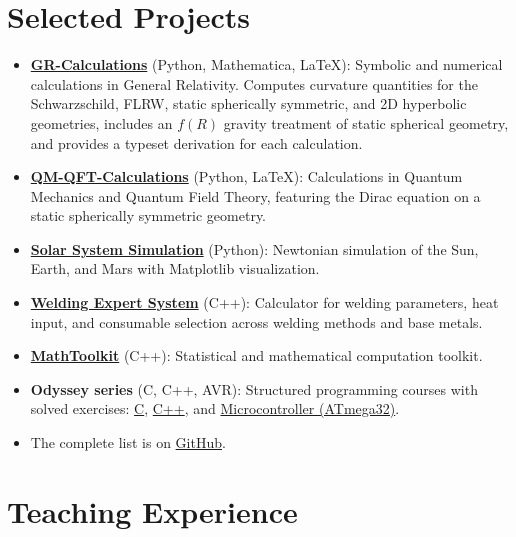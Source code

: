 \documentclass[11pt,a4paper]{article}
\begin{document}
	\section{Selected Projects}

	\begin{itemize}[label=--]
		\item \textbf{\href{https://github.com/AbolfazlMohammadi2005/GR-Calculations}{GR-Calculations}} (Python, Mathematica, LaTeX): Symbolic and numerical calculations in General Relativity. Computes curvature quantities for the Schwarzschild, FLRW, static spherically symmetric, and 2D hyperbolic geometries, includes an $f(R)$ gravity treatment of static spherical geometry, and provides a typeset derivation for each calculation.
		\item \textbf{\href{https://github.com/AbolfazlMohammadi2005/QM-QFT-Calculations}{QM-QFT-Calculations}} (Python, LaTeX): Calculations in Quantum Mechanics and Quantum Field Theory, featuring the Dirac equation on a static spherically symmetric geometry.
		\item \textbf{\href{https://github.com/AbolfazlMohammadi2005/Simple-small-scale-simulation-of-the-solar-system}{Solar System Simulation}} (Python): Newtonian simulation of the Sun, Earth, and Mars with Matplotlib visualization.
		\item \textbf{\href{https://github.com/AbolfazlMohammadi2005/Welding-Project}{Welding Expert System}} (C++): Calculator for welding parameters, heat input, and consumable selection across welding methods and base metals.
		\item \textbf{\href{https://github.com/AbolfazlMohammadi2005/MathToolkit}{MathToolkit}} (C++): Statistical and mathematical computation toolkit.
		\item \textbf{Odyssey series} (C, C++, AVR): Structured programming courses with solved exercises:
			\href{https://github.com/AbolfazlMohammadi2005/C-Odyssey}{C},
			\href{https://github.com/AbolfazlMohammadi2005/Cpp-Odyssey}{C++}, and
			\href{https://github.com/AbolfazlMohammadi2005/Microcontroller-Odyssey}{Microcontroller (ATmega32)}.
		\item The complete list is on \href{https://github.com/AbolfazlMohammadi2005?tab=repositories}{GitHub}.
	\end{itemize}

	\section{Teaching Experience}
\end{document}
